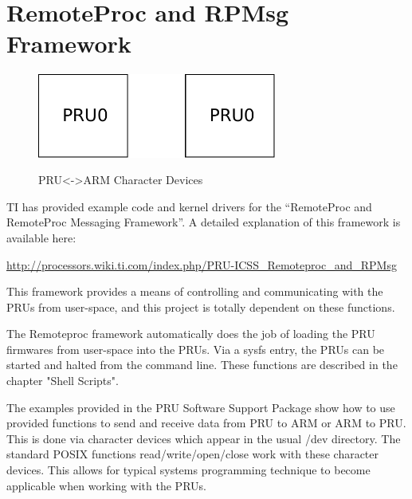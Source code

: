 %
%
%

\chapter{RemoteProc and RPMsg Framework}

\begin{figure}[h]
	\centering
    \includegraphics[width=0.7\textwidth]{diagrams/soc_system}
	\centering\bfseries
	\caption{PRU<->ARM Character Devices}
\end{figure}

TI has provided example code and kernel drivers for the ``RemoteProc and RemoteProc Messaging Framework''.  A detailed explanation of this framework is available here:

\url{http://processors.wiki.ti.com/index.php/PRU-ICSS_Remoteproc_and_RPMsg}

This framework provides a means of controlling and communicating with the PRUs from user-space, and this project is totally dependent on these functions.

The Remoteproc framework automatically does the job of loading the PRU firmwares from user-space into the PRUs.  Via a sysfs entry, the PRUs can be started and halted from the command line.  These functions are described in the chapter "Shell Scripts".

The examples provided in the PRU Software Support Package show how to use provided functions to send and receive data from PRU to ARM or ARM to PRU.  This is done via character devices which appear in the usual /dev directory.  The standard POSIX functions read/write/open/close work with these character devices.  This allows for typical systems programming technique to become applicable when working with the PRUs.

